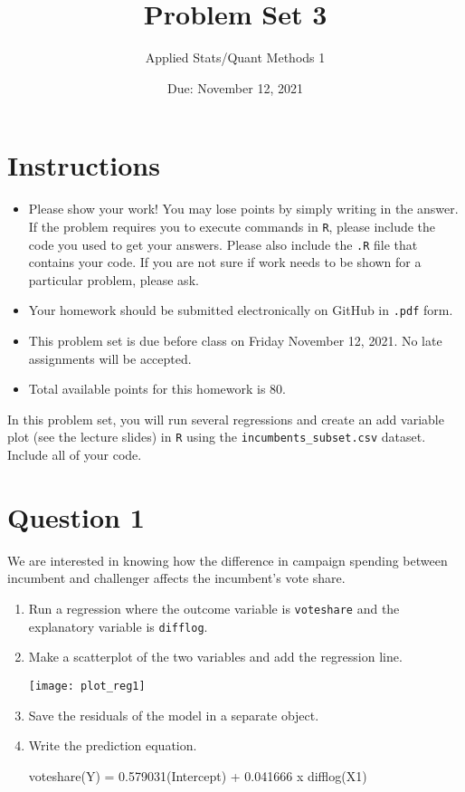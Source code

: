 \documentclass[12pt,letterpaper]{article}
\title{Problem Set 3}
\date{Due: November 12, 2021}
\author{Applied Stats/Quant Methods 1}
\begin{document}
	\maketitle
	\section*{Instructions}
	\begin{itemize}
		\item Please show your work! You may lose points by simply writing in the answer. If the problem requires you to execute commands in \texttt{R}, please include the code you used to get your answers. Please also include the \texttt{.R} file that contains your code. If you are not sure if work needs to be shown for a particular problem, please ask.
		\item Your homework should be submitted electronically on GitHub in \texttt{.pdf} form.
		\item This problem set is due before class on Friday November 12, 2021. No late assignments will be accepted.
		\item Total available points for this homework is 80.
	\end{itemize}

	
		\vspace{.25cm}
	
\noindent In this problem set, you will run several regressions and create an add variable plot (see the lecture slides) in \texttt{R} using the \texttt{incumbents\_subset.csv} dataset. Include all of your code.

	\vspace{.5cm}
\section*{Question 1} %
\vspace{.25cm}
\noindent We are interested in knowing how the difference in campaign spending between incumbent and challenger affects the incumbent's vote share. 
	\begin{enumerate}
		\item Run a regression where the outcome variable is \texttt{voteshare} and the explanatory variable is \texttt{difflog}.	
		  
		
		\item Make a scatterplot of the two variables and add the regression line. 	
		  		
		\texttt{[image: plot\_reg1]}
		
		\item Save the residuals of the model in a separate object.	
		  		
		
		\item Write the prediction equation. 
		
\vspace{.5cm}
		voteshare(Y) = 0.579031(Intercept) + 0.041666 x difflog(X1) 
					
	\end{enumerate}
	
\end{document}
